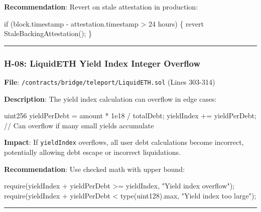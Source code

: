 \documentclass[
]{article}
\newenvironment{Shaded}{}{}
\newcommand{\NormalTok}[1]{#1}
\begin{document}
\textbf{Recommendation}: Revert on stale attestation in production:

\begin{Shaded}
\begin{Highlighting}[]
\NormalTok{if (block.timestamp {-} attestation.timestamp \textgreater{} 24 hours) \{}
\NormalTok{    revert StaleBackingAttestation();}
\NormalTok{\}}
\end{Highlighting}
\end{Shaded}

\begin{center}\rule{0.5\linewidth}{0.5pt}\end{center}

\subsubsection{H-08: LiquidETH Yield Index Integer
Overflow}\label{h-08-liquideth-yield-index-integer-overflow}

\textbf{File}: \texttt{/contracts/bridge/teleport/LiquidETH.sol} (Lines
303-314)

\textbf{Description}: The yield index calculation can overflow in edge
cases:

\begin{Shaded}
\begin{Highlighting}[]
\NormalTok{uint256 yieldPerDebt = amount * 1e18 / totalDebt;}
\NormalTok{yieldIndex += yieldPerDebt;  // Can overflow if many small yields accumulate}
\end{Highlighting}
\end{Shaded}

\textbf{Impact}: If \texttt{yieldIndex} overflows, all user debt
calculations become incorrect, potentially allowing debt escape or
incorrect liquidations.

\textbf{Recommendation}: Use checked math with upper bound:

\begin{Shaded}
\begin{Highlighting}[]
\NormalTok{require(yieldIndex + yieldPerDebt \textgreater{}= yieldIndex, "Yield index overflow");}
\NormalTok{require(yieldIndex + yieldPerDebt \textless{} type(uint128).max, "Yield index too large");}
\end{Highlighting}
\end{Shaded}

\begin{center}\rule{0.5\linewidth}{0.5pt}\end{center}
\end{document}
